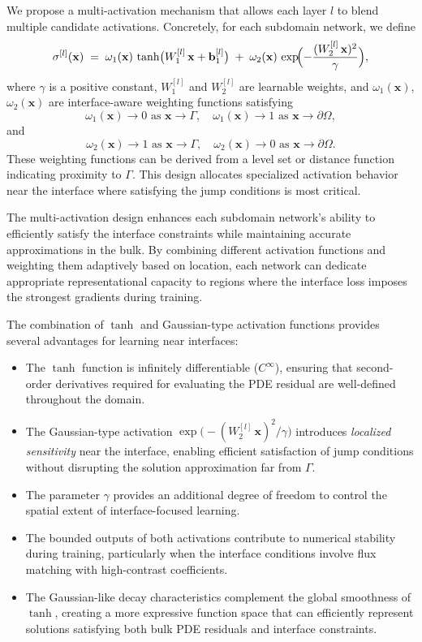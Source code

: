\documentclass{article}
\begin{document}
We propose a multi-activation mechanism that allows each layer $l$ to blend multiple candidate activations. Concretely, for each subdomain network, we define
    \[
    \sigma^{[l]}(\mathbf{x})
    \;=\;
    \omega_1(\mathbf{x})
\,\tanh\bigl(W_1^{[l]}\,\mathbf{x} + \mathbf{b}_1^{[l]}\bigr)
    \;+\;
    \omega_2(\mathbf{x})
\,\exp\!\Bigl(-\frac{(W_2^{[l]}\,\mathbf{x})^2}{\gamma}\Bigr),
\]
where $\gamma$ is a positive constant, $W_1^{[l]}$ and $W_2^{[l]}$ are learnable weights, and $\omega_1(\mathbf{x})$, $\omega_2(\mathbf{x})$ are interface-aware weighting functions satisfying
\[
\omega_1(\mathbf{x}) \to 0 \text{ as } \mathbf{x} \to \Gamma, \quad
\omega_1(\mathbf{x}) \to 1 \text{ as } \mathbf{x} \to \partial \Omega,
    \]
    and
    \[
\omega_2(\mathbf{x}) \to 1 \text{ as } \mathbf{x} \to \Gamma, \quad
\omega_2(\mathbf{x}) \to 0 \text{ as } \mathbf{x} \to \partial \Omega.
\]
These weighting functions can be derived from a level set or distance function indicating proximity to $\Gamma$. This design allocates specialized activation behavior near the interface where satisfying the jump conditions is most critical.

The multi-activation design enhances each subdomain network's ability to efficiently satisfy the interface constraints while maintaining accurate approximations in the bulk. By combining different activation functions and weighting them adaptively based on location, each network can dedicate appropriate representational capacity to regions where the interface loss imposes the strongest gradients during training.

The combination of $\tanh$ and Gaussian-type activation functions provides several advantages for learning near interfaces:
\begin{itemize}
    \item The $\tanh$ function is infinitely differentiable ($C^\infty$), ensuring that second-order derivatives required for evaluating the PDE residual are well-defined throughout the domain.
    \item The Gaussian-type activation $\exp\!\bigl(-(W_2^{[l]}\,\mathbf{x})^2/\gamma\bigr)$ introduces \emph{localized sensitivity} near the interface, enabling efficient satisfaction of jump conditions without disrupting the solution approximation far from $\Gamma$.  
    \item The parameter $\gamma$ provides an additional degree of freedom to control the spatial extent of interface-focused learning.
    \item The bounded outputs of both activations contribute to numerical stability during training, particularly when the interface conditions involve flux matching with high-contrast coefficients.
    \item The Gaussian-like decay characteristics complement the global smoothness of $\tanh$, creating a more expressive function space that can efficiently represent solutions satisfying both bulk PDE residuals and interface constraints.
\end{itemize}
\end{document}

